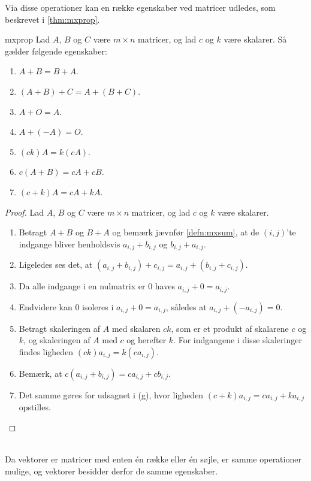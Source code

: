 %
Via disse operationer kan en række egenskaber ved matricer udledes, som beskrevet i \ref{thm:mxprop}.
%
\begin{thm}{}{mxprop}
Lad $A$, $B$ og $C$ være $m \times n$ matricer, og lad $c$ og $k$ være skalarer.
Så gælder følgende egenskaber:
\begin{enumerate}[label=(\alph*)]
\item $A + B = B + A$.
\item $(A + B) + C = A + (B + C)$.
\item $A + O = A$.
\item $A + (-A) = O$.
\item $(ck)A = k(cA)$.
\item $c(A + B) = cA + cB$.
\item $(c + k)A = cA + kA$.
\end{enumerate}
\end{thm}
%
\begin{proof}
Lad $A$, $B$ og $C$ være $m \times n$ matricer, og lad $c$ og $k$ være skalarer.
\begin{enumerate}[label=(\alph*)]
\item Betragt $A + B$ og $B + A$ og bemærk jævnfør \ref{defn:mxsum}, at de $(i,j)$'te indgange bliver henholdsvis $a_{i,j} + b_{i,j}$ og $b_{i,j} + a_{i,j}$.
%
\item Ligeledes ses det, at $(a_{i,j} + b_{i,j}) + c_{i,j} = a_{i,j} + (b_{i,j} + c_{i,j})$.
%
\item Da alle indgange i en nulmatrix er $0$ haves  $a_{i,j} + 0 = a_{i,j}$.
% 
\item Endvidere kan $0$ isoleres i $a_{i,j} + 0 = a_{i,j}$, således at $a_{i,j} + (-a_{i,j}) = 0$.
%
\item Betragt skaleringen af $A$ med skalaren $ck$, som er et produkt af skalarene $c$ og $k$, og skaleringen af $A$ med $c$ og herefter $k$.
For indgangene i disse skaleringer findes ligheden $(ck)a_{i,j} = k(ca_{i,j})$.
%
\item Bemærk, at $c(a_{i,j} + b_{i,j}) = ca_{i,j} + cb_{i,j}$.
%
\item Det samme gøres for udsagnet i (g), hvor ligheden $(c + k)a_{i,j} = ca_{i,j} + ka_{i,j}$ opstilles.
\end{enumerate}
\end{proof}
\noindent
\\
%
Da vektorer er matricer med enten én række eller én søjle, er samme operationer mulige, og vektorer besidder derfor de samme egenskaber.